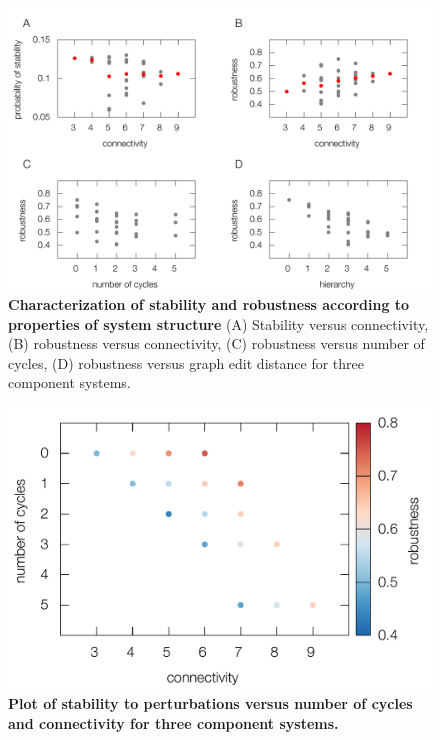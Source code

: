 \pagebreak

\begin{figure}[!ht]
\centering
\noindent\includegraphics[width=1.0\columnwidth]{fig/combinedfigs.pdf}
\caption{{\bf Characterization of stability and robustness according to properties of system structure} (A) Stability versus connectivity, (B) robustness versus connectivity, (C) robustness versus number of cycles, (D) robustness versus graph edit distance%
 for three component systems.
}
\label{fig:combined}
\end{figure}



\pagebreak

\begin{figure}[!ht]
\centering
\noindent\includegraphics[width=0.7\columnwidth]{fig/connectcycle3D3x3.pdf}
\caption{{\bf Plot of stability to perturbations versus number of cycles and connectivity for three component systems.} }
\label{fig:connectcycle3D3x3}
\end{figure}

